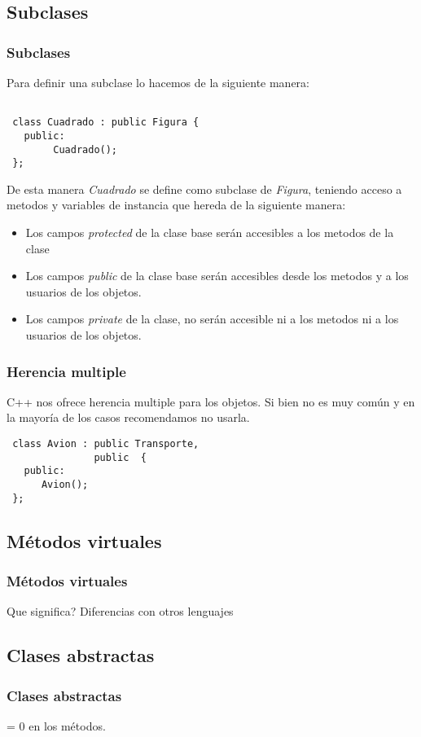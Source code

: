 \documentclass{beamer}
\begin{document}
\subsection{Subclases}
\begin{frame}[fragile]
\frametitle{Subclases}

Para definir una subclase lo hacemos de la siguiente manera:

\begin{verbatim}

 class Cuadrado : public Figura {
   public:
        Cuadrado(); 
 };
\end{verbatim}

De esta manera \emph{Cuadrado} se define como subclase de \emph{Figura}, teniendo acceso a 
metodos y variables de instancia que hereda de la siguiente manera:
\begin{itemize}
 \item Los campos \emph{protected} de la clase base serán accesibles a los metodos de la clase
 \item Los campos \emph{public} de la clase base serán accesibles desde los metodos y a los usuarios de los objetos.
 \item Los campos \emph{private} de la clase, no serán accesible ni a los metodos ni a los usuarios de los objetos.
\end{itemize}
\end{frame}

\begin{frame}[fragile]
\frametitle{Herencia multiple}
C++ nos ofrece herencia multiple para los objetos. 
Si bien no es muy común y en la mayoría de los casos recomendamos no usarla.

\begin{verbatim}
 class Avion : public Transporte,
               public  {
   public:
      Avion();
 };
\end{verbatim}


\end{frame}

\subsection{Métodos virtuales}
\begin{frame}
\frametitle{Métodos virtuales}
Que significa? 
Diferencias con otros lenguajes
\end{frame}



\subsection{Clases abstractas}
\begin{frame}
\frametitle{Clases abstractas}

 = 0 en los métodos.
\end{frame}
\end{document}
